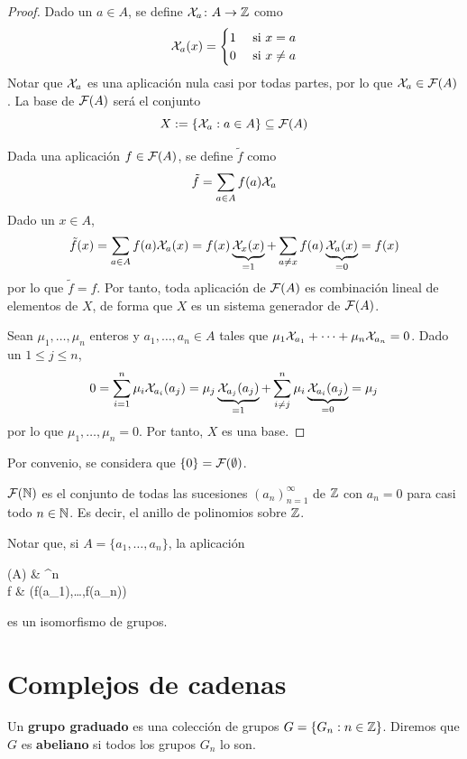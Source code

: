 \begin{proof}
Dado un $a \in A$, se define $\mathcal{X}_a\colon A \to \mathbb{Z}$ como
\[\mathcal{X}_a(x)=\begin{cases}
1&\mbox{ si }x=a\\
0&\mbox{ si }x\neq a
\end{cases}\]
Notar que $\mathcal{X}_a$ es una aplicación nula casi por todas partes, por lo que
$\mathcal{X}_a \in \mathcal{F}(A)$. La base de $\mathcal{F}(A)$ será el conjunto
\[X:=\{\mathcal{X}_a: a\in A\} \subseteq \mathcal{F}(A)\]

Dada una aplicación $f \in \mathcal{F}(A)$, se define $\tilde{f}$ como
\[\tilde{f}=\sum_{a \in A}f(a)\mathcal{X}_a\]
Dado un $x \in A$,
\begin{equation}
\label{tildef}\tilde{f}(x)=\sum_{a \in A} f(a)\mathcal{X}_a(x)=
f(x)\underbrace{\mathcal{X}_x(x)}_{=1}+
\sum_{a \neq x}f(a)\underbrace{\mathcal{X}_a(x)}_{=0}=f(x)
\end{equation}
por lo que $\tilde{f}=f$. Por tanto, toda aplicación de $\mathcal{F}(A)$ es
combinación lineal de elementos de $X$, de forma que $X$ es un sistema generador
de $\mathcal{F}(A)$.

Sean $\mu_1,\dots,\mu_n$ enteros y $a_1,\dots,a_n \in A$ tales que
$\mu_1\mathcal{X}_{a_1}+\dots+\mu_n\mathcal{X}_{a_n}=0$. Dado un $1 \leq j \leq n$,
\[0=\sum^n_{i=1}\mu_i\mathcal{X}_{a_i}(a_j)=
\mu_j\underbrace{\mathcal{X}_{a_j}(a_j)}_{=1}+
\sum^n_{i \neq j}\mu_i\underbrace{\mathcal{X}_{a_i}(a_j)}_{=0}=\mu_j\]
por lo que $\mu_1,\dots,\mu_n=0$. Por tanto, $X$ es una base.
\end{proof}

Por convenio, se considera que $\{0\}=\mathcal{F}(\emptyset)$.

\begin{example}
$\mathcal{F}(\mathbb{N})$ es el conjunto de todas las sucesiones $(a_n)_{n=1}^\infty$
de $\mathbb{Z}$ con $a_n=0$ para casi todo $n \in \mathbb{N}$. Es decir, el anillo de
polinomios sobre $\mathbb{Z}$.
\end{example}

Notar que, si $A=\{a_1,\dots,a_n\}$, la aplicación
\begin{diag}
\Psi\colon {}(A) \arrow[r]	& ^n\\[-0.8cm]
f \arrow[maps to,r]			& (f(a_1),\dots,f(a_n))
\end{diag}
es un isomorfismo de grupos.

\section{Complejos de cadenas}
\begin{definition}
Un \textbf{grupo graduado} es una colección de grupos $G=\{G_n: n \in \mathbb{Z}\}$.
Diremos que $G$ es \textbf{abeliano} si todos los grupos $G_n$ lo son.
\end{definition}

